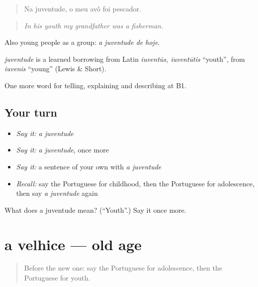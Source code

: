 \begin{quote}
Na juventude, o meu avô foi pescador.
\end{quote}

\begin{quote}
\emph{In his youth my grandfather was a fisherman.}
\end{quote}

Also young people as a group: \emph{a juventude de hoje}.

\begin{cousinweb}
\emph{juventude} is a learned borrowing from Latin \emph{iuventūs, iuventūtis} \textquotedblleft{}youth\textquotedblright{}, from \emph{iuvenis} \textquotedblleft{}young\textquotedblright{} (Lewis \& Short).
\end{cousinweb}

\begin{grammarlens}[title={What you've built}]
One more word for telling, explaining and describing at B1.
\end{grammarlens}

\subsection*{Your turn}
\begin{itemize}
\raggedright
  \item \emph{Say it:} \emph{a juventude}
  \item \emph{Say it:} \emph{a juventude}, once more
  \item \emph{Say it:} a sentence of your own with \emph{a juventude}
  \item \emph{Recall:} say the Portuguese for childhood, then the Portuguese for adolescence, then say \emph{a juventude} again
\end{itemize}

\begin{tcolorbox}[breakable,colback=teal!4,colframe=teal!35!black,title={Before you move on}]
What does a juventude mean? (\textquotedblleft{}Youth\textquotedblright{}.) Say it once more.
\end{tcolorbox}
\section[a velhice]{a velhice — old age}

\label{lesson:PT-C311-velhice}



\begin{quote}
Before the new one: say the Portuguese for adolescence, then the Portuguese for youth.
\end{quote}

